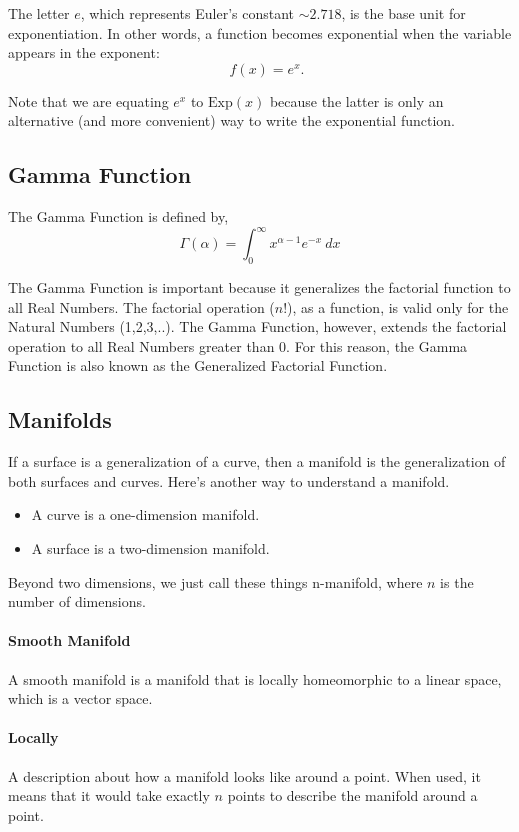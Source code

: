 \documentclass{article}
\begin{document}
The letter $e$, which represents Euler's constant $\sim 2.718$, is the base unit for exponentiation. In other words, a function becomes exponential when the variable appears in the exponent:
$$
\quad f(x) = e^x.
$$

 
Note that we are equating $e^x$ to $\text{Exp}(x)$ because the latter is only an alternative (and more convenient) way to write the exponential function.

\subsection{Gamma Function}
The Gamma Function is defined by,
$$
\Gamma(\alpha) = \int_0^\infty x^{\alpha-1} e^{-x} \: dx
$$

The Gamma Function is important because it generalizes the factorial function to all Real Numbers. The factorial operation ($n!$), as a function, is valid only for the Natural Numbers (1,2,3,..). The Gamma Function, however, extends the factorial operation to all Real Numbers greater than 0. For this reason, the Gamma Function is also known as the Generalized Factorial Function.

\subsection{Manifolds}
If a surface is a generalization of a curve, then a manifold is the generalization of both surfaces and curves. Here's another way to understand a manifold.

\begin{itemize}
    \item A curve is a one-dimension manifold.
    \item A surface is a two-dimension manifold.
\end{itemize}

Beyond two dimensions, we just call these things n-manifold, where $n$ is the number of dimensions.

\paragraph{Smooth Manifold} A smooth manifold is a manifold that is locally homeomorphic to a linear space, which is a vector space.

\paragraph{Locally} A description about how a manifold looks like around a point. When used, it means that it would take exactly $n$ points to describe the manifold around a point.
\end{document}
